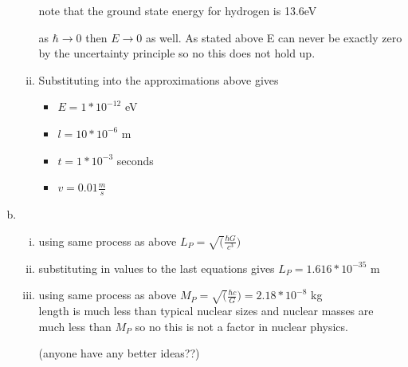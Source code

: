 \documentclass[ps1.tex]{subfiles}
\begin{document}
\begin{enumerate}[(a)]
\begin{enumerate}[i.]
note that the ground state energy for hydrogen is 13.6eV

as $\hbar\rightarrow 0$ then $E\rightarrow 0$ as well.  As stated above E can never be exactly zero by the uncertainty principle so no this does not hold up.

\item Substituting into the approximations above gives

\begin{itemize}
  \item [] $E = 1*10^{-12}$ eV
  \item [] $l = 10*10^{-6}$ m
  \item [] $t= 1*10^{-3}$ seconds 
  \item [] $v = 0.01 \frac {m}{s}$
\end{itemize}
\end{enumerate}
\noindent\makebox[\linewidth]{\rule{\paperwidth}{0.4pt}}
\item \mbox{}\\
\noindent
\begin{enumerate}[i.]
\item using same process as above $L_P =  \sqrt( \frac {\hbar G} {c^3} )$\\
\item substituting in values to the last equations gives $L_P = 1.616*10^{-35}$ m\\
\item using same process as above $M_P =  \sqrt( \frac {\hbar c} {G} ) = 2.18*10^{-8}$ kg\\

length is much less than typical nuclear sizes and nuclear masses are much less than $M_P$ so no this is not a factor in nuclear physics.

(anyone have any better ideas??)
\end{enumerate}
\end{enumerate}
\noindent\makebox[\linewidth]{\rule{\paperwidth}{0.4pt}}
\end{document}
